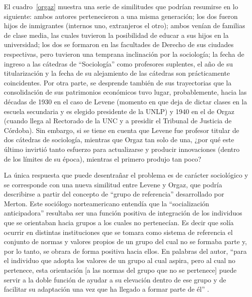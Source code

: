 El cuadro~\ref{orgaz} muestra una serie de similitudes que podrían resumirse en lo siguiente: ambos autores pertenecieron a una misma generación; los dos fueron hijos de inmigrantes (internos uno, extranjeros el otro); ambos venían de familias de clase media, las cuales tuvieron la posibilidad de educar a sus hijos en la universidad; los dos se formaron en las facultades de Derecho de sus ciudades respectivas, pero tuvieron una temprana inclinación por la sociología; la fecha de ingreso a las cátedras de \enquote{Sociología} como profesores suplentes, el año de su titularización y la fecha de su alejamiento de las cátedras son prácticamente coincidentes. Por otra parte, se desprende también de sus trayectorias que la consolidación de sus patrimonios económicos tuvo lugar, probablemente, hacia las décadas de 1930 en el caso de Levene (momento en que deja de dictar clases en la escuela secundaria y es elegido presidente de la UNLP) y 1940 en el de Orgaz (cuando llega al Rectorado de la UNC y a presidir el Tribunal de Justicia de Córdoba). Sin embargo, si se tiene en cuenta que Levene fue profesor titular de dos cátedras de sociología, mientras que Orgaz tan solo de una, ¿por qué este último invirtió tanto esfuerzo para actualizarse y producir innovaciones (dentro de los límites de su época), mientras el primero produjo tan poco?

La única respuesta que puede desentrañar el problema es de carácter sociológico y se corresponde con una nueva similitud entre Levene y Orgaz, que podría describirse a partir del concepto de \enquote{grupo de referencia} desarrollado por Merton. Este sociólogo norteamericano entendía que la \enquote{socialización anticipadora} resultaba ser una función positiva de integración de los individuos que se orientaban hacia grupos a los cuales no pertenecían. Es decir que solía ocurrir en distintas instituciones que se tomara como sistema de referencia el conjunto de normas y valores propios de un grupo del cual no se formaba parte y, por lo tanto, se obrara de forma positiva hacia ellos. En palabras del autor, \enquote{para el individuo que adopta los valores de un grupo al cual aspira, pero al cual no pertenece, esta orientación [a las normas del grupo que no se pertenece] puede servir a la doble función de ayudar a su elevación dentro de ese grupo y de facilitar su adaptación una vez que ha llegado a formar parte de él} \parencite[345]{1705-MERTON2002}.

